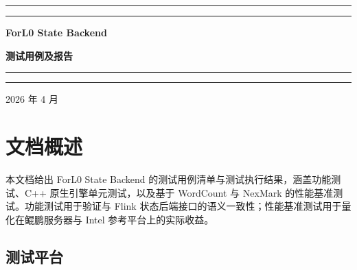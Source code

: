 \documentclass[a4paper,11pt]{article}
\newcommand{\project}{ForL0 State Backend}
\newcommand{\coverrule}{{\color{accent}\rule{\linewidth}{0.9pt}}}
\newcommand{\coverrulethin}{{\color{accent!55}\rule{\linewidth}{0.3pt}}}
\begin{document}
\begin{titlepage}
\thispagestyle{empty}
\centering
\vspace*{5.5cm}

\coverrule
\vspace{2pt}
\coverrulethin

\vspace{1.6cm}
{\sffamily\huge\bfseries\color{accent} \project\par}
\vspace{0.8cm}
{\sffamily\LARGE\bfseries 测试用例及报告\par}

\vspace{1.6cm}
\coverrulethin
\vspace{2pt}
\coverrule

\vfill

{\sffamily\large\color{accent!85} 2026 年 4 月\par}

\vspace{1.2cm}
\end{titlepage}

\pagestyle{plain}
\tableofcontents
\clearpage
{}
\setcounter{page}{1}
\pagestyle{fancy}

\section{文档概述}

本文档给出 \project{} 的测试用例清单与测试执行结果，涵盖功能测试、C++ 原生引擎单元测试，以及基于 WordCount 与 NexMark 的性能基准测试。功能测试用于验证与 Flink 状态后端接口的语义一致性；性能基准测试用于量化在鲲鹏服务器与 Intel 参考平台上的实际收益。

\subsection{测试平台}
\end{document}
